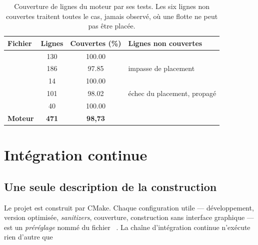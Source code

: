 \begin{table}[ht]
    \centering
    \begin{tabular}{@{}l S[table-format=3.0] S[table-format=3.2] l@{}}
        \toprule
        \textbf{Fichier}   & {\textbf{Lignes}} & {\textbf{Couvertes (\si{\percent})}} &
        \textbf{Lignes non couvertes}                                                                               \\
        \midrule
             & 130               & 100.00                               &                             \\
          & 186               & 97.85                                & impasse de placement        \\
         & 14                & 100.00                               &                             \\
           & 101               & 98.02                                & échec du placement, propagé \\
            & 40                & 100.00                               &                             \\
        \midrule
        \textbf{Moteur}    & {\bfseries 471}   & {\bfseries 98,73}                    &                             \\
        \bottomrule
    \end{tabular}
    \caption{Couverture de lignes du moteur par ses tests. Les six lignes non couvertes
        traitent toutes le cas, jamais observé, où une flotte ne peut pas être placée.}
    \label{tab-couverture}
\end{table}

\section{Intégration continue}
\label{sec-ci}

\subsection{Une seule description de la construction}

Le projet est construit par CMake. Chaque configuration utile --- développement, version
optimisée, \emph{sanitizers}, couverture, construction sans interface graphique --- est un
\emph{préréglage} nommé du fichier ~\cite{cmakepresets}. La chaîne d'intégration
continue n'exécute rien d'autre que

